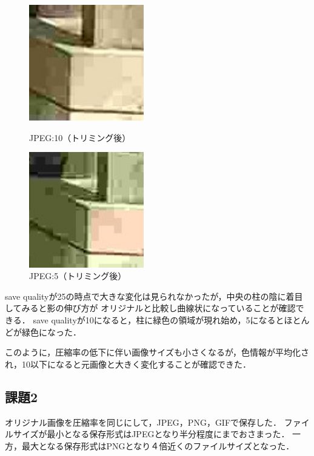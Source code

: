 \documentclass[a4paper,11pt]{bxjsarticle}
\begin{document}
 \begin{figure}[htbp]
  \begin{minipage}{0.5\hsize}
   \begin{center}
    \includegraphics[width=50mm]{sample_j10_tri.jpg}
   \end{center}
   \caption{JPEG:10（トリミング後）}
   \label{fig:j10_tri}
  \end{minipage}
  \begin{minipage}{0.5\hsize}
   \begin{center}
    \includegraphics[width=50mm]{sample_j5_tri.jpg}
   \end{center}
   \caption{JPEG:5（トリミング後）}
   \label{fig:j5_tri}
  \end{minipage}
 \end{figure}

 save qualityが25の時点で大きな変化は見られなかったが，中央の柱の陰に着目してみると影の伸び方が
 オリジナルと比較し曲線状になっていることが確認できる．
 save qualityが10になると，柱に緑色の領域が現れ始め，5になるとほとんどが緑色になった．

 このように，圧縮率の低下に伴い画像サイズも小さくなるが，色情報が平均化され，10以下になると元画像と大きく変化することが確認できた．

\newpage
  \subsection{課題2}
    オリジナル画像を圧縮率を同じにして，JPEG，PNG，GIFで保存した．
    ファイルサイズが最小となる保存形式はJPEGとなり半分程度にまでおさまった．
    一方，最大となる保存形式はPNGとなり４倍近くのファイルサイズとなった．
    
\end{document}
